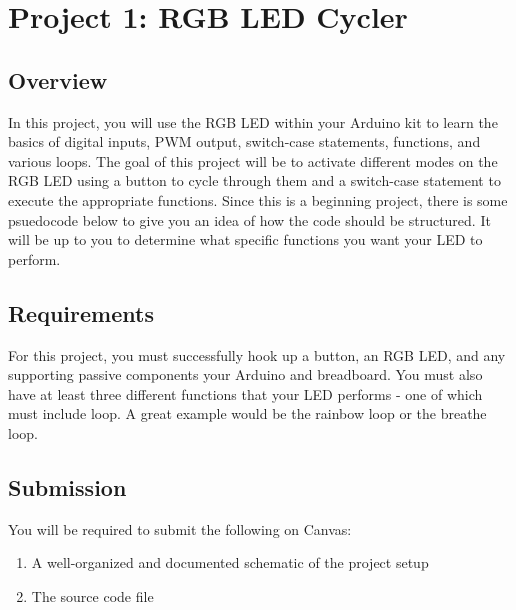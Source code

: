 %

\chapter{Project 1: RGB LED Cycler}

\section*{Overview}
In this project, you will use the RGB LED within your Arduino kit to learn the basics of digital inputs, PWM output, switch-case statements, functions, and various loops.
The goal of this project will be to activate different modes on the RGB LED using a button to cycle through them and a switch-case statement to execute the appropriate functions.
Since this is a beginning project, there is some psuedocode below to give you an idea of how the code should be structured.
It will be up to you to determine what specific functions you want your LED to perform.

\section*{Requirements}
For this project, you must successfully hook up a button, an RGB LED, and any supporting passive components your Arduino and breadboard.
You must also have at least three different functions that your LED performs - one of which must include loop. 
A great example would be the rainbow loop or the breathe loop.

\section*{Submission}
You will be required to submit the following on Canvas:
\begin{enumerate}
    \item A well-organized and documented schematic of the project setup
    \item The source code file
\end{enumerate}


